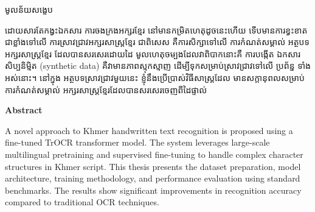\begin{center}
    {\khmerfont\fontsize{13pt}{20pt}\selectfont មូលន័យសង្ខេប \par}
    \vspace{1cm}
    \begin{minipage}{0.9\textwidth}
        \khmernormal
        \small
        ដោយសារតែកង្វះឯកសារ ការចងក្រងអក្សរខ្មែរ នៅមានកម្រិតហេតុដូចនេះហើយ ទើបមានការខ្វះខាត ជាខ្លាំងទៅលើ ការស្រាវជ្រាវអក្សរសាស្ដ្រខ្មែរ ជាពិសេស គឺការសិក្សាទៅលើ
        ការកំណត់សម្គាល់ អត្ថបទអក្សរសាស្ដ្រខ្មែរ ដែលបានសរសេរដោយដៃ មូលហេតុចម្បងដែលវាពិបាកនោះគឺ ការបង្កើត ឯកសារសិប្បនិម្មិត (synthetic data) គឺវាមានភាពស្មុកស្មាញ ដើម្បីទុកសម្រាប់ស្រាវជ្រាវទៅលើ ប្រព័ន្ន ទាំងអស់នោះ។
        នៅក្នុង អត្ថបទស្រាវជ្រាវមួយនេះ ខ្ញុំនឹងប្រើប្រាស់វិធីសាស្ដ្រដែល មានសក្ដានុពលសម្រាប់ ការកំណត់សម្គាល់ អក្សរសាស្ដ្រខ្មែរដែលបានសរសេរចេញពីដៃផ្ទាល់
    \end{minipage}
\end{center}
\vspace{1.5cm}

\begin{center}
    {\bfseries\LARGE Abstract \par}
    \vspace{1cm}
    \begin{minipage}{0.9\textwidth}
        \englishfont
        \small
        A novel approach to Khmer handwritten text recognition is proposed using a fine-tuned TrOCR transformer model. The system leverages large-scale multilingual pretraining and supervised fine-tuning to handle complex character structures in Khmer script. This thesis presents the dataset preparation, model architecture, training methodology, and performance evaluation using standard benchmarks. The results show significant improvements in recognition accuracy compared to traditional OCR techniques.
    \end{minipage}
\end{center}